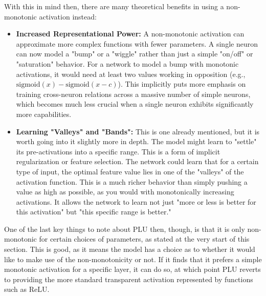 \documentclass[11pt, letterpaper]{article}
\begin{document}
With this in mind then, there are many theoretical benefits in using a non-monotonic activation instead:
\begin{itemize}
    \item \textbf{Increased Representational Power:} A non-monotonic activation can approximate more complex functions with fewer parameters. A single neuron can now model a "bump" or a "wiggle" rather than just a simple "on/off" or "saturation" behavior. For a network to model a bump with monotonic activations, it would need at least two values working in opposition (e.g., $\text{sigmoid}(x) - \text{sigmoid}(x-c)$). This implicitly puts more emphasis on training cross-neuron relations across a massive number of simple neurons, which becomes much less crucial when a single neuron exhibits significantly more capabilities.
    \item \textbf{Learning "Valleys" and "Bands":} This is one already mentioned, but it is worth going into it slightly more in depth. The model might learn to "settle" its pre-activations into a specific range. This is a form of implicit regularization or feature selection. The network could learn that for a certain type of input, the optimal feature value lies in one of the "valleys" of the activation function. This is a much richer behavior than simply pushing a value as high as possible, as you would with monotonically increasing activations. It allows the network to learn not just "more or less is better for this activation" but "this specific range is better."
\end{itemize}

One of the last key things to note about PLU then, though, is that it is only non-monotonic for certain choices of parameters, as stated at the very start of this section. This is good, as it means the model has a choice as to whether it would like to make use of the non-monotonicity or not. If it finds that it prefers a simple monotonic activation for a specific layer, it can do so, at which point PLU reverts to providing the more standard transparent activation represented by functions such as ReLU.
\end{document}
